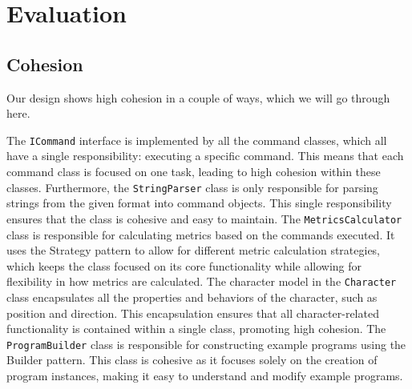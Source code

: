 \documentclass[11pt,a4paper]{article}
\begin{document}



\section*{Evaluation}

\subsection*{Cohesion}

Our design shows high cohesion in a couple of ways, which we will go through here. 

The \texttt{ICommand} interface is implemented by all the command classes, which all have a single responsibility: executing a specific command. This means that each command class is focused on one task, leading to high cohesion within these classes.
Furthermore, the \texttt{StringParser} class is only responsible for parsing strings from the given format into command objects. This single responsibility ensures that the class is cohesive and easy to maintain.
The \texttt{MetricsCalculator} class is responsible for calculating metrics based on the commands executed. It uses the Strategy pattern to allow for different metric calculation strategies, which keeps the class focused on its core functionality while allowing for flexibility in how metrics are calculated.
The character model in the \texttt{Character} class encapsulates all the properties and behaviors of the character, such as position and direction. This encapsulation ensures that all character-related functionality is contained within a single class, promoting high cohesion.
The \texttt{ProgramBuilder} class is responsible for constructing example programs using the Builder pattern. This class is cohesive as it focuses solely on the creation of program instances, making it easy to understand and modify example programs. 
\end{document}
